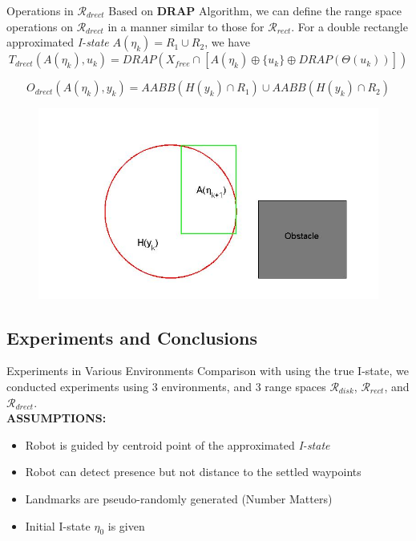 \begin{frame}{Operations in $\mathcal{R}_{drect}$}
  Based on \textbf{DRAP} Algorithm, we can define the range space operations on
  $\mathcal{R}_{drect}$ in a manner similar to those for $\mathcal{R}_{rect}$.
  For a double rectangle approximated \emph{I-state} $A(\eta_k) = R_1 \cup R_2$,
  we have
  $$ T_{drect}(A(\eta_k), u_k) = DRAP(X_{free} \cap [A(\eta_k) \oplus \{ u_k \} \oplus DRAP(\Theta(u_k))])$$

  $$O_{drect}(A(\eta_k), y_k) = AABB(H(y_k) \cap R_1)\cup AABB(H(y_k) \cap R_2)$$
  \begin{figure}
    \includegraphics[scale=0.3]{figs/drectevolve5.jpg}
  \end{figure}
\end{frame}


\subsection[Experiments]{Experiments and Conclusions}
\begin{frame}{Experiments in Various Environments}
  Comparison with using the true I-state, we conducted experiments using 3
  environments, and 3 range spaces $\mathcal{R}_{disk}$, $\mathcal{R}_{rect}$,
  and  $\mathcal{R}_{drect}$. \\
  \textbf{ASSUMPTIONS:}\\
  \begin{itemize}
  \item Robot is guided by centroid point of the approximated \emph{I-state}
  \item Robot can detect presence but not distance to the settled waypoints
  \item Landmarks are pseudo-randomly generated (Number Matters)
  \item Initial I-state $\eta_0$ is given
  \end{itemize}    
\end{frame}


